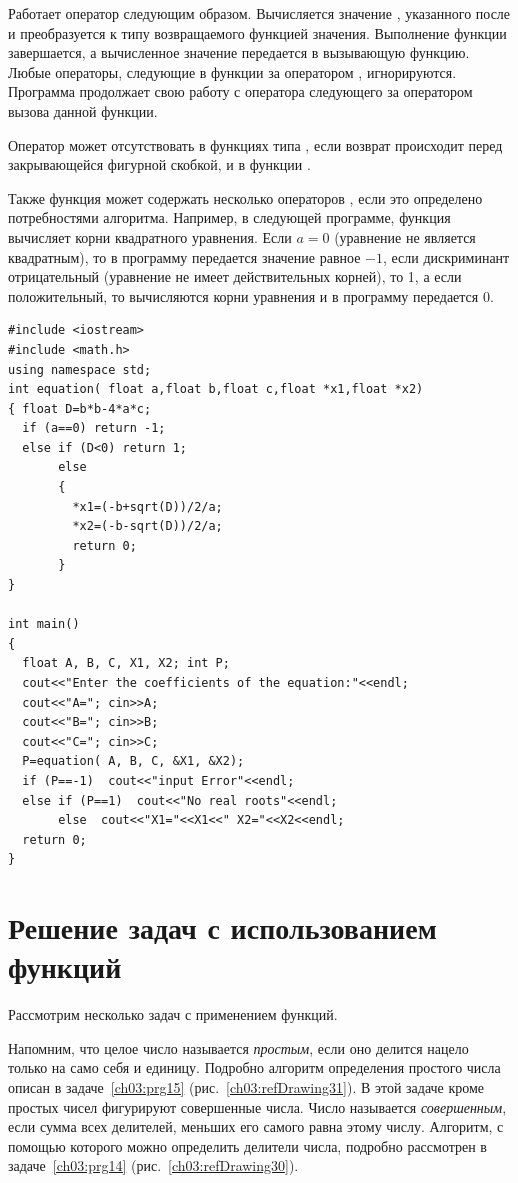 
Работает оператор следующим образом. Вычисляется значение , указанного после
 и преобразуется к типу возвращаемого функцией значения. Выполнение функции завершается, а
вычисленное значение передается в вызывающую функцию. Любые операторы, следующие в функции за оператором
, игнорируются. Программа продолжает свою работу с оператора следующего за оператором вызова
данной функции.

Оператор  может отсутствовать в функциях типа , если возврат происходит
перед закрывающейся фигурной скобкой, и в функции .

Также функция может содержать несколько операторов , если это определено потребностями
алгоритма. Например, в следующей программе, функция  вычисляет корни квадратного уравнения.
Если $a=0$ (уравнение не является квадратным), то в программу передается значение равное
$-1$, если дискриминант отрицательный (уравнение не имеет действительных корней), то
1, а если положительный, то  вычисляются корни уравнения и в программу передается 0.
\begin{lstlisting}
#include <iostream>
#include <math.h>
using namespace std;
int equation( float a,float b,float c,float *x1,float *x2)
{ float D=b*b-4*a*c;
  if (a==0) return -1;
  else if (D<0) return 1;
       else 
       {
         *x1=(-b+sqrt(D))/2/a;
         *x2=(-b-sqrt(D))/2/a;
         return 0;
       }
}

int main()
{
  float A, B, C, X1, X2; int P;
  cout<<"Enter the coefficients of the equation:"<<endl;
  cout<<"A="; cin>>A;
  cout<<"B="; cin>>B;
  cout<<"C="; cin>>C;
  P=equation( A, B, C, &X1, &X2);
  if (P==-1)  cout<<"input Error"<<endl;
  else if (P==1)  cout<<"No real roots"<<endl;
       else  cout<<"X1="<<X1<<" X2="<<X2<<endl;
  return 0;
}
\end{lstlisting}

\section[Решение задач с использованием функций]{Решение задач с использованием функций}
Рассмотрим несколько задач с применением функций.


Напомним, что целое число называется \emph{простым}, если оно делится нацело только на само себя и единицу.
Подробно алгоритм определения простого числа описан в задаче~\ref{ch03:prg15} (рис.~\ref{ch03:refDrawing31}). 
В этой задаче кроме простых чисел
фигурируют совершенные числа. Число называется \emph{совершенным}, если сумма всех делителей, меньших его
самого равна этому числу. Алгоритм, с помощью которого можно определить делители числа, подробно рассмотрен 
в задаче~\ref{ch03:prg14} (рис.~\ref{ch03:refDrawing30}).

